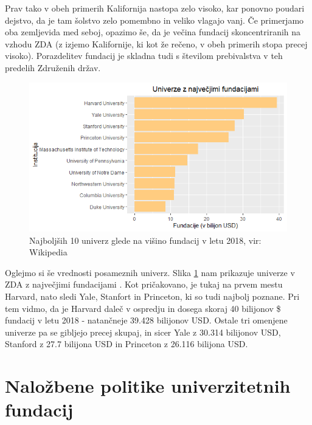 \documentclass[12pt, a4paper]{article}
\begin{document}
Prav tako v obeh primerih Kalifornija nastopa zelo visoko, kar ponovno poudari dejstvo, da je tam šolstvo zelo pomembno in veliko vlagajo vanj. Če primerjamo oba zemljevida med seboj, opazimo še, da je večina fundacij skoncentriranih na vzhodu ZDA (z izjemo Kalifornije, ki kot že rečeno, v obeh primerih stopa precej visoko). Porazdelitev fundacij je skladna tudi s številom prebivalstva v teh predelih Združenih držav.\\

\begin{figure}[!h]
\centering
\includegraphics[width = 15 cm]{grafi_zemljevidi/top10.png}
\caption{Najboljših 10 univerz glede na višino fundacij v letu 2018, vir: Wikipedia}
\label{Slika 3}
\end{figure}

Oglejmo si še vrednosti posameznih univerz. Slika \ref{Slika 3} nam prikazuje univerze v ZDA z največjimi fundacijami \cite{wiki}. Kot pričakovano, je tukaj na prvem mestu Harvard, nato sledi Yale, Stanfort in Princeton, ki so tudi najbolj poznane. Pri tem vidmo, da je Harvard daleč v ospredju in dosega skoraj 40 bilijonov \$ fundacij v letu 2018 - natančneje 39.428 bilijonov USD. Ostale tri omenjene univerze pa se gibljejo precej skupaj, in sicer Yale z 30.314
bilijonov USD, Stanford z 27.7 bilijona USD in Princeton z 26.116 bilijona USD.



\section[Naložbene politike univerzitetnih fundacij]{Naložbene politike univerzitetnih fundacij}
\end{document}
